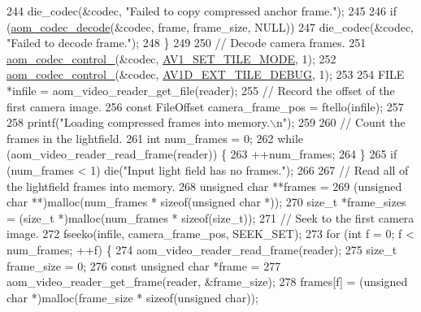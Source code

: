 \begin{DoxyCodeInclude}
{{{{{244       die\_codec(&codec, \textcolor{stringliteral}{"Failed to copy compressed anchor frame."});
245 
246     \textcolor{keywordflow}{if} (\hyperlink{group__decoder_gab03fdb999d1f83a5896869a3ba5f68f7}{aom\_codec\_decode}(&codec, frame, frame\_size, NULL))
247       die\_codec(&codec, \textcolor{stringliteral}{"Failed to decode frame."});
248   \}
249 
250   \textcolor{comment}{// Decode camera frames.}
251   \hyperlink{group__codec_ga51eb332a40dcacc39000ab8e0be36b79}{aom\_codec\_control\_}(&codec, \hyperlink{group__aom__decoder_gga3865fd4b3192489baa9a5c3632ebe97ba0795d8084ae8c78528c01587198df9e2}{AV1\_SET\_TILE\_MODE}, 1);
252   \hyperlink{group__codec_ga51eb332a40dcacc39000ab8e0be36b79}{aom\_codec\_control\_}(&codec, \hyperlink{group__aom__decoder_gga3865fd4b3192489baa9a5c3632ebe97baffdaca91296725bd16142a33f3cc6522}{AV1D\_EXT\_TILE\_DEBUG}, 1);
253 
254   FILE *infile = aom\_video\_reader\_get\_file(reader);
255   \textcolor{comment}{// Record the offset of the first camera image.}
256   \textcolor{keyword}{const} FileOffset camera\_frame\_pos = ftello(infile);
257 
258   printf(\textcolor{stringliteral}{"Loading compressed frames into memory.\(\backslash\)n"});
259 
260   \textcolor{comment}{// Count the frames in the lightfield.}
261   \textcolor{keywordtype}{int} num\_frames = 0;
262   \textcolor{keywordflow}{while} (aom\_video\_reader\_read\_frame(reader)) \{
263     ++num\_frames;
264   \}
265   \textcolor{keywordflow}{if} (num\_frames < 1) die(\textcolor{stringliteral}{"Input light field has no frames."});
266 
267   \textcolor{comment}{// Read all of the lightfield frames into memory.}
268   \textcolor{keywordtype}{unsigned} \textcolor{keywordtype}{char} **frames =
269       (\textcolor{keywordtype}{unsigned} \textcolor{keywordtype}{char} **)malloc(num\_frames * \textcolor{keyword}{sizeof}(\textcolor{keywordtype}{unsigned} \textcolor{keywordtype}{char} *));
270   \textcolor{keywordtype}{size\_t} *frame\_sizes = (\textcolor{keywordtype}{size\_t} *)malloc(num\_frames * \textcolor{keyword}{sizeof}(\textcolor{keywordtype}{size\_t}));
271   \textcolor{comment}{// Seek to the first camera image.}
272   fseeko(infile, camera\_frame\_pos, SEEK\_SET);
273   \textcolor{keywordflow}{for} (\textcolor{keywordtype}{int} f = 0; f < num\_frames; ++f) \{
274     aom\_video\_reader\_read\_frame(reader);
275     \textcolor{keywordtype}{size\_t} frame\_size = 0;
276     \textcolor{keyword}{const} \textcolor{keywordtype}{unsigned} \textcolor{keywordtype}{char} *frame =
277         aom\_video\_reader\_get\_frame(reader, &frame\_size);
278     frames[f] = (\textcolor{keywordtype}{unsigned} \textcolor{keywordtype}{char} *)malloc(frame\_size * \textcolor{keyword}{sizeof}(\textcolor{keywordtype}{unsigned} \textcolor{keywordtype}{char}));
}}}}}
\end{DoxyCodeInclude}

